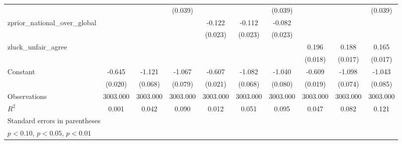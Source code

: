 {\begin{tabular}{l*{9}{c}}
                    &                     &                     &     (0.039)         &                     &                     &     (0.039)         &                     &                     &     (0.039)         \\
\addlinespace
zprior\_national\_over\_global&                     &                     &                     &      -0.122\sym{***}&      -0.112\sym{***}&      -0.082\sym{***}&                     &                     &                     \\
                    &                     &                     &                     &     (0.023)         &     (0.023)         &     (0.023)         &                     &                     &                     \\
\addlinespace
zluck\_unfair\_agree  &                     &                     &                     &                     &                     &                     &       0.196\sym{***}&       0.188\sym{***}&       0.165\sym{***}\\
                    &                     &                     &                     &                     &                     &                     &     (0.018)         &     (0.017)         &     (0.017)         \\
\addlinespace
Constant            &      -0.645\sym{***}&      -1.121\sym{***}&      -1.067\sym{***}&      -0.607\sym{***}&      -1.082\sym{***}&      -1.040\sym{***}&      -0.609\sym{***}&      -1.098\sym{***}&      -1.043\sym{***}\\
                    &     (0.020)         &     (0.068)         &     (0.079)         &     (0.021)         &     (0.068)         &     (0.080)         &     (0.019)         &     (0.074)         &     (0.085)         \\
\midrule
Observations        &    3003.000         &    3003.000         &    3003.000         &    3003.000         &    3003.000         &    3003.000         &    3003.000         &    3003.000         &    3003.000         \\
\(R^{2}\)           &       0.001         &       0.042         &       0.090         &       0.012         &       0.051         &       0.095         &       0.047         &       0.082         &       0.121         \\
\bottomrule
\multicolumn{10}{l}{\footnotesize Standard errors in parentheses}\\
\multicolumn{10}{l}{\footnotesize \sym{*} \(p<0.10\), \sym{**} \(p<0.05\), \sym{***} \(p<0.01\)}\\
\end{tabular}
}

